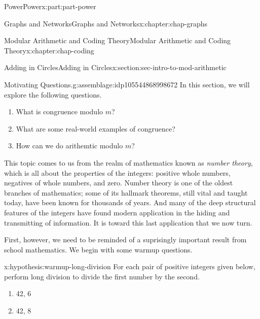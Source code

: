 \documentclass[oneside,10pt,]{book}
\numberwithin{equation}{section}
\begin{document}
\begin{partptx}{Power}{}{Power}{}{}{x:part:part-power}
\typeout{************************************************}
%
\begin{chapterptx}{Graphs and Networks}{}{Graphs and Networks}{}{}{x:chapter:chap-graphs}
\end{chapterptx}
%
\typeout{************************************************}
\typeout{************************************************}
%
\begin{chapterptx}{Modular Arithmetic and Coding Theory}{}{Modular Arithmetic and Coding Theory}{}{}{x:chapter:chap-coding}
%
%
\typeout{************************************************}
\typeout{************************************************}
%
\begin{sectionptx}{Adding in Circles}{}{Adding in Circles}{}{}{x:section:sec-intro-to-mod-arithmetic}
\begin{assemblage}{Motivating Questions.}{g:assemblage:idp105544868998672}%
In this section, we will explore the following questions. %
\begin{enumerate}
\item{}What is congruence modulo \(m\)?%
\item{}What are some real-world examples of congruence?%
\item{}How can we do arithemtic modulo \(m\)?%
\end{enumerate}
%
\end{assemblage}
This topic comes to us from the realm of mathematics known as \emph{number theory}, which is all about the properties of the integers: positive whole numbers, negatives of whole numbers, and zero. Number theory is one of the oldest branches of mathematics; some of its hallmark theorems, still vital and taught today, have been known for thousands of years. And many of the deep structural features of the integers have found modern application in the hiding and transmitting of information. It is toward this last application that we now turn.%
\par
First, however, we need to be reminded of a suprisingly important result from school mathematics. We begin with some warmup questions.%
\begin{hypothesis}{}{}{x:hypothesis:warmup-long-division}%
For each pair of positive integers given below, perform long division to divide the first number by the second.%
%
\begin{enumerate}
\item{}42, 6%
\item{}42, 8%

\end{enumerate}
\end{hypothesis}
\end{sectionptx}
\end{chapterptx}
\end{partptx}
\end{document}
